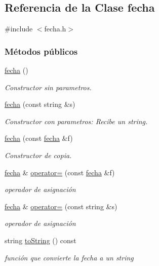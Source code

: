 \hypertarget{classfecha}{\subsection{Referencia de la Clase fecha}
\label{classfecha}
}


{\ttfamily \#include $<$fecha.\+h$>$}

\subsubsection*{Métodos públicos}
\begin{DoxyCompactItemize}
\item 
\hyperlink{classfecha_a6775ef84b5838e12e28fd341793f4539}{fecha} ()
\begin{DoxyCompactList}\small\item\em Constructor sin parametros. \end{DoxyCompactList}\item 
\hyperlink{classfecha_aed5c22d5eeb15f1f2927d5a2c28b74df}{fecha} (const string \&s)
\begin{DoxyCompactList}\small\item\em Constructor con parametros\+: Recibe un string. \end{DoxyCompactList}\item 
\hyperlink{classfecha_a2cb762c17ba6ea6bcb6b0aabb919bef6}{fecha} (const \hyperlink{classfecha}{fecha} \&f)
\begin{DoxyCompactList}\small\item\em Constructor de copia. \end{DoxyCompactList}\item 
\hyperlink{classfecha}{fecha} \& \hyperlink{classfecha_aeb5a68104e936f98eb933b4d6856f841}{operator=} (const \hyperlink{classfecha}{fecha} \&f)
\begin{DoxyCompactList}\small\item\em operador de asignación \end{DoxyCompactList}\item 
\hyperlink{classfecha}{fecha} \& \hyperlink{classfecha_afff8905488f3d97ecfe6141f8521ac22}{operator=} (const string \&s)
\begin{DoxyCompactList}\small\item\em operador de asignación \end{DoxyCompactList}\item 
string \hyperlink{classfecha_a26d22b980284408eac0da084f358c43b}{to\+String} () const 
\begin{DoxyCompactList}\small\item\em función que convierte la fecha a un string \end{DoxyCompactList}\item 

\end{DoxyCompactItemize}
